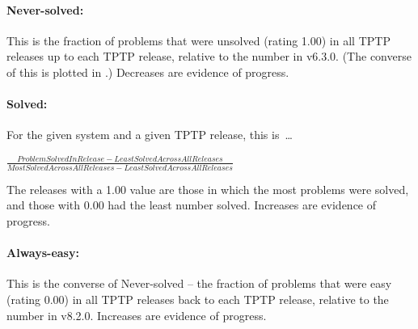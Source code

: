 \documentclass[runningheads]{llncs}
\begin{document}
\paragraph{Never-solved:}
This is the fraction of problems that were unsolved (rating 1.00) in all TPTP releases 
up to each TPTP release, relative to the number in v6.3.0.
(The converse of this is plotted in \cite{SSP21}.)
Decreases are evidence of progress.

\vspace*{-0.5em}
\paragraph{Solved:}
For the given system and a given TPTP release, this is~\ldots
\begin{center}
$\frac{ProblemSolvedInRelease - LeastSolvedAcrossAllReleases}
  {MostSolvedAcrossAllReleases - LeastSolvedAcrossAllReleases}$ \\
\end{center}
The releases with a 1.00 value are those in which the most problems were solved, and those with
0.00 had the least number solved.
Increases are evidence of progress.

\vspace*{-0.5em}
\paragraph{Always-easy:}
This is the converse of Never-solved -- the fraction of problems that were easy (rating 0.00) in 
all TPTP releases back to each TPTP release, relative to the number in v8.2.0.
Increases are evidence of progress.

\vspace*{-0.5em}
\end{document}
